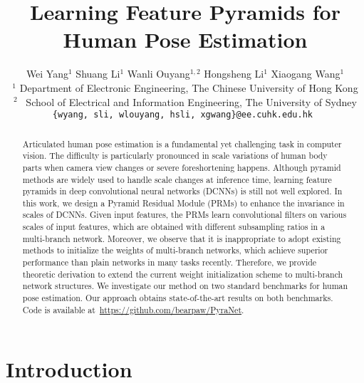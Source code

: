 \documentclass[10pt,twocolumn,letterpaper]{article}
\begin{document}
\title{Learning Feature Pyramids for Human Pose Estimation}

\author{
Wei Yang$^{1}$ \quad 
Shuang Li$^{1}$ \quad 
Wanli Ouyang$^{1,2}$ \quad 
Hongsheng Li$^{1}$ \quad
Xiaogang Wang$^{1}$ \\
$^{1}$ Department of Electronic Engineering, The Chinese University of Hong Kong\\
$^{2}$~ School of Electrical and Information Engineering, The University of Sydney \\
{\tt\small \{wyang, sli, wlouyang, hsli, xgwang\}@ee.cuhk.edu.hk  } \\
}

\maketitle
\thispagestyle{empty}


\begin{abstract}
Articulated human pose estimation is a fundamental yet challenging task in computer vision. 
The difficulty is particularly pronounced in scale variations of human body parts when camera view changes or severe foreshortening happens. 
Although pyramid methods are widely used to handle scale changes at inference time, learning feature pyramids in deep convolutional neural networks (DCNNs) is still not well explored. 
In this work, we design a Pyramid Residual Module (PRMs) to enhance the invariance in scales of DCNNs. 
Given input features, the PRMs learn convolutional filters on various scales of input features, which are obtained with different subsampling ratios in a multi-branch network. 
Moreover, we observe that it is inappropriate to adopt existing methods to initialize the weights of multi-branch networks, 
which achieve superior performance than plain networks in many tasks recently. 
Therefore, we provide theoretic derivation to extend the current weight initialization scheme to multi-branch network structures. 
We investigate our method on two standard benchmarks for human pose estimation. 
Our approach obtains state-of-the-art results on both benchmarks. 
Code is available at~\url{https://github.com/bearpaw/PyraNet}. 
 


\end{abstract}



\section{Introduction}
\end{document}
